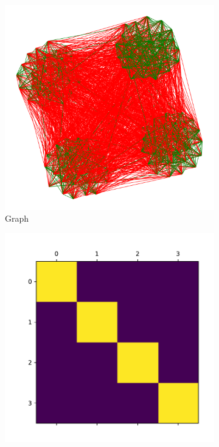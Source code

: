 \documentclass{beamer}
\begin{document}
\begin{frame}[c]
	\begin{figure}
		\begin{center}
			\begin{subfigure}[b]{0.3\textwidth}
				\centering
				\includegraphics[width=\textwidth]{out/synthetic/model2_graph4.pdf}
				\caption{Graph}
				\label{fig:}
			\end{subfigure}
			\begin{subfigure}[b]{0.3\textwidth}
				\centering
				\includegraphics[width=\textwidth]{out/synthetic/model2_omega_positive4.pdf}

\end{subfigure}
\end{center}
\end{figure}
\end{frame}
\end{document}
